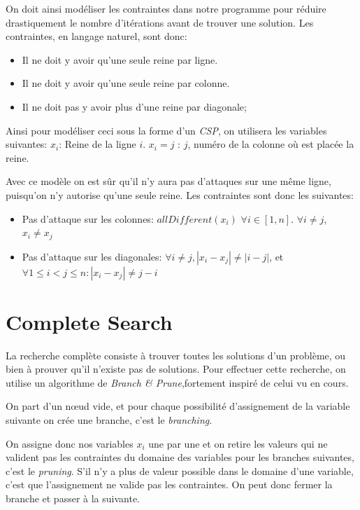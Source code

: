 \documentclass{article}
\begin{document}
On doit ainsi modéliser les contraintes dans notre programme pour réduire drastiquement le nombre d'itérations avant de trouver une solution. Les contraintes, en langage naturel, sont donc:

\begin{itemize}
\item Il ne doit y avoir qu'une seule reine par ligne.
\item Il ne doit y avoir qu'une seule reine par colonne.
\item Il ne doit pas y avoir plus d'une reine par diagonale;
\end{itemize}

Ainsi pour modéliser ceci sous la forme d'un \emph{CSP}, on utilisera les variables suivantes:
$x_i$: Reine de la ligne $i$.
$x_i = j$ : $j$, numéro de la colonne où est placée la reine.

Avec ce modèle on est sûr qu'il n'y aura pas d'attaques sur une même ligne, puisqu'on n'y autorise qu'une seule reine.
Les contraintes sont donc les suivantes:
\begin{itemize}
\item Pas d'attaque sur les colonnes: $allDifferent(x_i)$ $\forall i \in [1, n]$. $\forall i \neq j$, $x_i \neq x_j$

\item Pas d'attaque sur les diagonales:  $\forall i \neq j, |x_i - x_j| \neq |i - j|$, et $\forall  1 \leq i < j \leq n : |x_i - x_j | \neq j - i$
\end{itemize}


\section{Complete Search}

La recherche complète consiste à trouver toutes les solutions d'un problème, ou bien à prouver qu'il n'existe pas de solutions. 
Pour effectuer cette recherche, on utilise un algorithme de \emph{Branch \& Prune},fortement inspiré de celui vu en cours. 

On part d'un nœud vide, et pour chaque possibilité d'assignement de la variable suivante on crée une branche, c'est le \emph{branching}.

On assigne donc nos variables $x_i$ une par une et on retire les valeurs qui ne valident pas les contraintes du domaine des variables pour les branches suivantes, c'est le \emph{pruning}. S'il n'y a plus de valeur possible dans le domaine d'une variable, c'est que l'assignement ne valide pas les contraintes. On peut donc fermer la branche et passer à la suivante.
\end{document}
